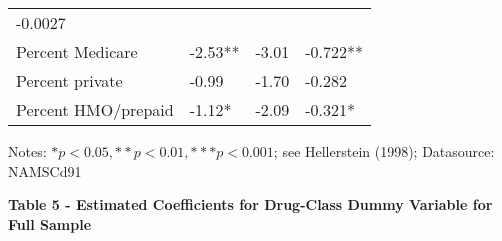 \documentclass[
]{book}
\begin{document}
\begin{longtable}[]{@{}llll@{}}
\begin{minipage}[t]{0.21\columnwidth}
-0.0027\strut
\end{minipage}\tabularnewline
\begin{minipage}[t]{0.17\columnwidth}\raggedright
Percent Medicare\strut
\end{minipage} & \begin{minipage}[t]{0.25\columnwidth}\raggedright
-2.53**\strut
\end{minipage} & \begin{minipage}[t]{0.25\columnwidth}\raggedright
-3.01\strut
\end{minipage} & \begin{minipage}[t]{0.21\columnwidth}\raggedright
-0.722**\strut
\end{minipage}\tabularnewline
\begin{minipage}[t]{0.17\columnwidth}\raggedright
Percent private\strut
\end{minipage} & \begin{minipage}[t]{0.25\columnwidth}\raggedright
-0.99\strut
\end{minipage} & \begin{minipage}[t]{0.25\columnwidth}\raggedright
-1.70\strut
\end{minipage} & \begin{minipage}[t]{0.21\columnwidth}\raggedright
-0.282\strut
\end{minipage}\tabularnewline
\begin{minipage}[t]{0.17\columnwidth}\raggedright
Percent HMO/prepaid\strut
\end{minipage} & \begin{minipage}[t]{0.25\columnwidth}\raggedright
-1.12*\strut
\end{minipage} & \begin{minipage}[t]{0.25\columnwidth}\raggedright
-2.09\strut
\end{minipage} & \begin{minipage}[t]{0.21\columnwidth}\raggedright
-0.321*\strut
\end{minipage}\tabularnewline
\bottomrule
\end{longtable}

Notes: \(*p < 0.05, **p < 0.01, ***p < 0.001\); see Hellerstein (1998);
Datasource: NAMSCd91

\textbf{Table 5 - Estimated Coefficients for Drug-Class Dummy Variable
for Full Sample}
\end{document}

